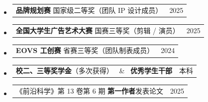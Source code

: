 \documentclass[a4paper,11pt]{article}
\makeatletter
\newcommand{\resumeProjectHeading}[2]{
    \item
    \begin{tabular*}{0.97\textwidth}{l@{\extracolsep{\fill}}r}
      \small#1 & #2 \\
    \end{tabular*}\vspace{-7pt}
}
\newcommand{\resumeSubHeadingListStart}{
\begin{itemize}[leftmargin=0.15in, label={}]
}
\newcommand{\resumeSubHeadingListEnd}{
\end{itemize}
}
\makeatother
\begin{document}
\resumeSubHeadingListStart

\resumeProjectHeading
{\textbf{品牌规划赛} 国家级二等奖（团队 IP 设计成员）}
{2025}

\resumeProjectHeading
{\textbf{全国大学生广告艺术大赛} 国赛三等奖（剪辑 / 演员）}
{2025}

\resumeProjectHeading
{\textbf{EOVS 工创赛} 省赛三等奖（团队制表成员）}
{2024}

\resumeProjectHeading
{\textbf{校二、三等奖学金}（多次获得）
\ \& \
\textbf{优秀学生干部}}
{本科}

\resumeProjectHeading
{《前沿科学》第 13 卷第 6 期
\textbf{第一作者}发表论文}
{2025}

\resumeSubHeadingListEnd

\end{document}
